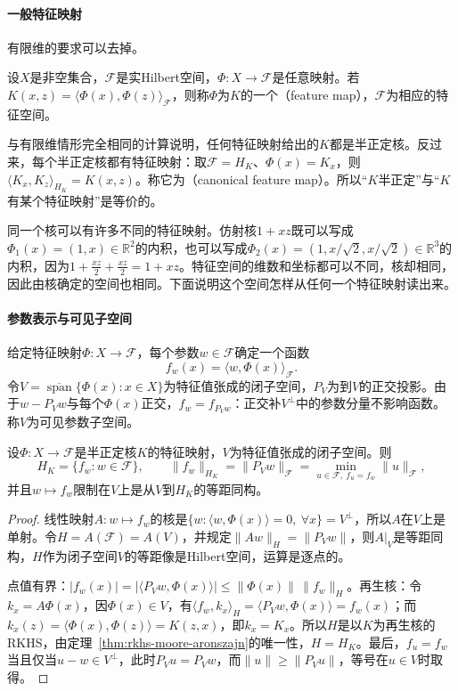 \paragraph{一般特征映射}

有限维的要求可以去掉。

\begin{definition}[特征映射]
\label{def:rkhs-feature-map}
设$X$是非空集合，$\mathcal F$是实Hilbert空间，$\Phi:X\to\mathcal F$是任意映射。若$K(x,z)=\langle\Phi(x),\Phi(z)\rangle_{\mathcal F}$，则称$\Phi$为$K$的一个（feature map），$\mathcal F$为相应的特征空间。
\end{definition}

与有限维情形完全相同的计算说明，任何特征映射给出的$K$都是半正定核。反过来，每个半正定核都有特征映射：取$\mathcal F=H_K$、$\Phi(x)=K_x$，则$\langle K_x,K_z\rangle_{H_K}=K(x,z)$。称它为（canonical feature map）。所以“$K$半正定”与“$K$有某个特征映射”是等价的。

同一个核可以有许多不同的特征映射。仿射核$1+xz$既可以写成$\Phi_1(x)=(1,x)\in\mathbb R^2$的内积，也可以写成$\Phi_2(x)=(1,x/\sqrt2,x/\sqrt2)\in\mathbb R^3$的内积，因为$1+\tfrac{x z}{2}+\tfrac{xz}{2}=1+xz$。特征空间的维数和坐标都可以不同，核却相同，因此由核确定的空间也相同。下面说明这个空间怎样从任何一个特征映射读出来。

\paragraph{参数表示与可见子空间}

给定特征映射$\Phi:X\to\mathcal F$，每个参数$w\in\mathcal F$确定一个函数
\[
f_w(x)=\langle w,\Phi(x)\rangle_{\mathcal F}.
\]
令$V=\overline{\operatorname{span}}\{\Phi(x):x\in X\}$为特征值张成的闭子空间，$P_V$为到$V$的正交投影。由于$w-P_Vw$与每个$\Phi(x)$正交，$f_w=f_{P_Vw}$：正交补$V^\perp$中的参数分量不影响函数。称$V$为可见参数子空间。

\begin{theorem}[特征映射给出的RKHS]
\label{thm:rkhs-feature-space}
设$\Phi:X\to\mathcal F$是半正定核$K$的特征映射，$V$为特征值张成的闭子空间。则
\[
H_K=\{f_w:w\in\mathcal F\},\qquad
\|f_w\|_{H_K}=\|P_Vw\|_{\mathcal F}=\min_{u\in\mathcal F,\ f_u=f_w}\|u\|_{\mathcal F} ,
\]
并且$w\mapsto f_w$限制在$V$上是从$V$到$H_K$的等距同构。
\end{theorem}

\begin{proof}
线性映射$A:w\mapsto f_w$的核是$\{w:\langle w,\Phi(x)\rangle=0,\ \forall x\}=V^\perp$，所以$A$在$V$上是单射。令$H=A(\mathcal F)=A(V)$，并规定$\|Aw\|_H=\|P_Vw\|$，则$A|_V$是等距同构，$H$作为闭子空间$V$的等距像是Hilbert空间，运算是逐点的。

点值有界：$|f_w(x)|=|\langle P_Vw,\Phi(x)\rangle|\le\|\Phi(x)\|\,\|f_w\|_H$。再生核：令$k_x=A\Phi(x)$，因$\Phi(x)\in V$，有$\langle f_w,k_x\rangle_H=\langle P_Vw,\Phi(x)\rangle=f_w(x)$；而$k_x(z)=\langle\Phi(x),\Phi(z)\rangle=K(z,x)$，即$k_x=K_x$。所以$H$是以$K$为再生核的RKHS，由定理~\ref{thm:rkhs-moore-aronszajn}的唯一性，$H=H_K$。最后，$f_u=f_w$当且仅当$u-w\in V^\perp$，此时$P_Vu=P_Vw$，而$\|u\|\ge\|P_Vu\|$，等号在$u\in V$时取得。
\end{proof}

